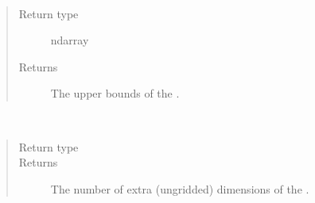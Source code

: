 \documentclass[letterpaper,10pt,english]{sphinxmanual}
\begin{document}
\begin{fulllineitems}
\begin{fulllineitems}
\begin{quote}
\begin{description}
\end{description}\end{quote}

\end{fulllineitems}


\begin{fulllineitems}
\label{\detokenize{field:ESMF.api.field.Field.upper_bounds}}~\begin{quote}\begin{description}
\item[{Return type}] \leavevmode
ndarray

\item[{Returns}] \leavevmode
The upper bounds of the {\hyperref[\detokenize{field:ESMF.api.field.Field}]{}}.

\end{description}\end{quote}

\end{fulllineitems}


\begin{fulllineitems}
\label{\detokenize{field:ESMF.api.field.Field.xd}}~\begin{quote}\begin{description}
\item[{Return type}] \leavevmode
{}

\item[{Returns}] \leavevmode
The number of extra (ungridded) dimensions of the
{\hyperref[\detokenize{field:ESMF.api.field.Field}]{}}.

\end{description}\end{quote}

\end{fulllineitems}



\end{fulllineitems}
\end{document}
